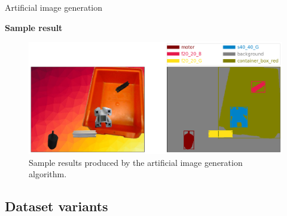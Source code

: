\documentclass{beamer}
\begin{document}
\begin{frame}{Artificial image generation}
	
	\textbf{Sample result}	
		
	\begin{figure}
		\centering
		\includegraphics[scale=0.26]{images/sample_result_1}
		\captionsetup{justification=centering,margin=0.2cm}
		\caption{Sample results produced by the artificial image generation algorithm.}
		\label{Fig:sample}
	\end{figure}
\end{frame}

\subsection{Dataset variants}
\end{document}
